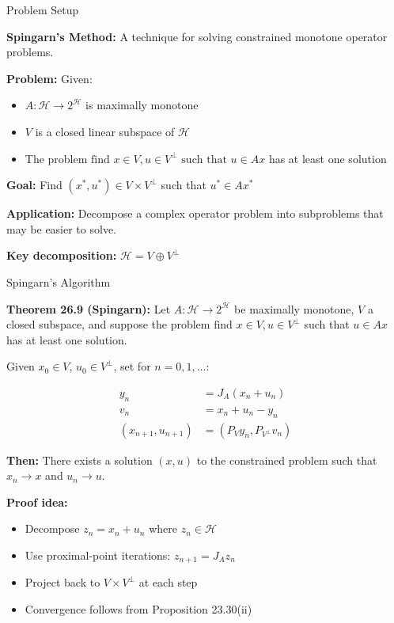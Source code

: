 \documentclass[aspectratio=169,10pt]{beamer}
\begin{document}
\begin{frame}{Problem Setup}

\textbf{Spingarn's Method:} A technique for solving constrained monotone operator problems.

\vspace{0.3cm}
\textbf{Problem:} Given:
\begin{itemize}
  \item $A: \mathcal{H} \to 2^{\mathcal{H}}$ is maximally monotone
  \item $V$ is a closed linear subspace of $\mathcal{H}$
  \item The problem $\text{find } x \in V, u \in V^{\perp} \text{ such that } u \in Ax$ has at least one solution
\end{itemize}

\textbf{Goal:} Find $(x^*, u^*) \in V \times V^{\perp}$ such that $u^* \in Ax^*$

\vspace{0.3cm}
\textbf{Application:} Decompose a complex operator problem into subproblems that may be easier to solve.

\vspace{0.3cm}
\textbf{Key decomposition:} $\mathcal{H} = V \oplus V^{\perp}$

\end{frame}

\begin{frame}{Spingarn's Algorithm}

\textbf{Theorem 26.9 (Spingarn):} Let $A: \mathcal{H} \to 2^{\mathcal{H}}$ be maximally monotone, $V$ a closed subspace, and suppose the problem $\text{find } x \in V, u \in V^{\perp}$ such that $u \in Ax$ has at least one solution.

\vspace{0.2cm}
Given $x_0 \in V$, $u_0 \in V^{\perp}$, set for $n = 0, 1, \ldots$:

\begin{align*}
  y_n &= J_A(x_n + u_n) \\
  v_n &= x_n + u_n - y_n \\
  (x_{n+1}, u_{n+1}) &= (P_V y_n, P_{V^{\perp}} v_n)
\end{align*}

\textbf{Then:} There exists a solution $(x, u)$ to the constrained problem such that $x_n \to x$ and $u_n \to u$.

\vspace{0.3cm}
\textbf{Proof idea:}
\begin{itemize}
  \item Decompose $z_n = x_n + u_n$ where $z_n \in \mathcal{H}$
  \item Use proximal-point iterations: $z_{n+1} = J_A z_n$
  \item Project back to $V \times V^{\perp}$ at each step
  \item Convergence follows from Proposition 23.30(ii)
\end{itemize}

\end{frame}
\end{document}
